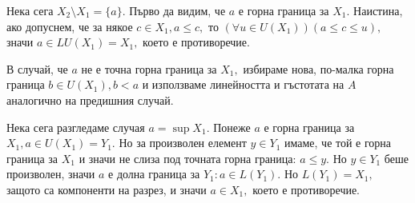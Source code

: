 \documentclass{article}
\begin{document}
Нека сега $X_2 \setminus X_1 = \{a\}.$ Първо да видим, че $a$ е горна граница за $X_1.$ Наистина, ако допуснем, че за някое $c \in X_1, a \leq c,$ то $(\forall u \in U(X_1))(a \leq c \leq u),$ значи $a \in LU(X_1) = X_1,$ което е противоречие.

В случай, че $a$ не е точна горна граница за $X_1,$ избираме нова, по-малка горна граница $b \in U(X_1), b < a$ и използваме линейността и гъстотата на $A$ аналогично на предишния случай.

Нека сега разгледаме случая $a = \sup X_1.$ Понеже $a$ е горна граница за $X_1, a \in U(X_1) = Y_1.$
Но за произволен елемент $y \in Y_1$ имаме, че той е горна граница за $X_1$ и значи не слиза под точната горна граница: $a \leq y.$ Но $y \in Y_1$ беше произволен, значи $a$ е долна граница за $Y_1: a \in L(Y_1).$ Но $L(Y_1) = X_1,$ защото са компоненти на разрез, и значи $a \in X_1,$ което е противоречие.
\end{document}
